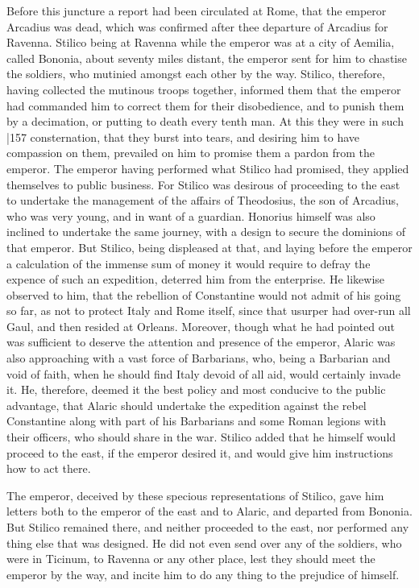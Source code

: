 Before this juncture a report had been circulated at Rome, that the emperor Arcadius was dead, which was confirmed after thee departure of Arcadius for Ravenna. Stilico being at Ravenna while the emperor was at a city of Aemilia, called Bononia, about
seventy miles distant, the emperor sent for him to chastise the soldiers, who mutinied amongst each other by the way. Stilico, therefore, having collected the mutinous troops together, informed them that the emperor had commanded him to correct them for their disobedience, and to punish them by a decimation, or putting to death every tenth man. At this they were in such
|157 consternation, that they burst into tears, and desiring him to have compassion on them, prevailed on him to promise them a pardon from the emperor. The emperor having performed what Stilico had promised, they applied themselves to public business. For Stilico was desirous of proceeding to the east to undertake the management of the affairs of Theodosius, the son of Arcadius, who was very young, and in want of a guardian. Honorius himself was also inclined to undertake the same journey, with a design to secure the dominions of that emperor. But Stilico, being displeased at that, and laying before the emperor a calculation of the immense sum of money it would require to defray the expence of such an expedition, deterred him from the enterprise. He likewise observed to him, that the rebellion of Constantine would not admit of his going so far, as not to protect Italy and Rome itself, since that usurper had over-run all Gaul, and then resided at Orleans. Moreover, though what he had pointed out was sufficient to deserve the attention and presence of the emperor, Alaric was also approaching with a vast force of Barbarians, who, being a Barbarian and void of faith, when he should find Italy devoid of all aid, would certainly invade it. He, therefore, deemed it the best policy and most conducive to the public advantage, that Alaric should undertake the expedition against the rebel Constantine along with part of his Barbarians and some Roman legions with their officers, who should share in the war. Stilico added that he himself would proceed to the east, if the emperor desired it, and would give him instructions how to act there.

The emperor, deceived by these specious representations of Stilico, gave him letters both to the emperor of the east and to Alaric, and departed from Bononia. But Stilico remained there, and neither proceeded to the east, nor performed any thing else that was designed. He did not even send over any of the soldiers, who were in Ticinum, to Ravenna or any other place, lest they should meet the emperor by the way, and incite him to do any thing to the prejudice of himself.

